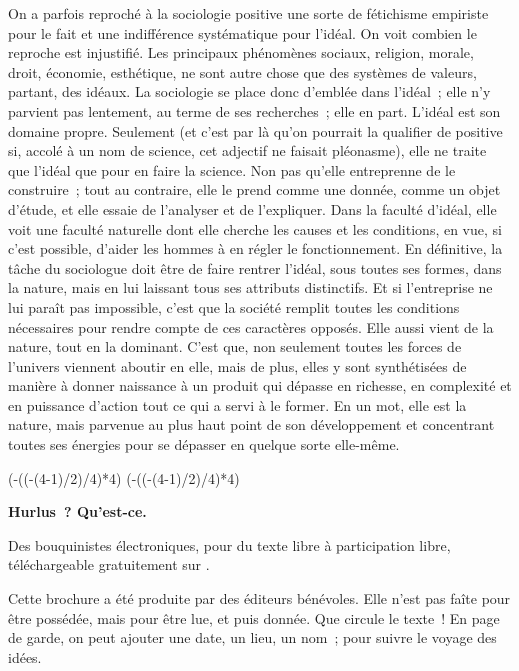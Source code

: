 \documentclass[french,twoside]{book} %
\def\truncdiv#1#2{((#1-(#2-1)/2)/#2)}
\def\moduloop#1#2{(#1-\truncdiv{#1}{#2}*#2)}
\def\modulo#1#2{\number\numexpr\moduloop{#1}{#2}\relax}
\begin{document}
On a parfois reproché à la sociologie positive une sorte de fétichisme empiriste pour le fait et une indifférence systématique pour l’idéal. On voit combien le reproche est injustifié. Les principaux phénomènes sociaux, religion, morale, droit, économie, esthétique, ne sont autre chose que des systèmes de valeurs, partant, des idéaux. La sociologie se place donc d’emblée dans l’idéal ; elle n’y parvient pas lentement, au terme de ses recherches ; elle en part. L’idéal est son domaine propre. Seulement (et c’est par là qu’on pourrait la qualifier de positive si, accolé à un nom de science, cet adjectif ne faisait pléonasme), elle ne traite que l’idéal que pour en faire la science. Non pas qu’elle entreprenne de le construire ; tout au contraire, elle le prend comme une donnée, comme un objet d’étude, et elle essaie de l’analyser et de l’expliquer. Dans la faculté d’idéal, elle voit une faculté naturelle dont elle cherche les causes et les conditions, en vue, si c’est possible, d’aider les hommes à en régler le fonctionnement. En définitive, la tâche du sociologue doit être de faire rentrer l’idéal, sous toutes ses formes, dans la nature, mais en lui laissant tous ses attributs distinctifs. Et si l’entreprise ne lui paraît pas impossible, c’est que la société remplit toutes les conditions nécessaires pour rendre compte de ces caractères opposés. Elle aussi vient de la nature, tout en la dominant. C’est que, non seulement toutes les forces de l’univers viennent aboutir en elle, mais de plus, elles y sont synthétisées de manière à donner naissance à un produit qui dépasse en richesse, en complexité et en puissance d’action tout ce qui a servi à le former. En un mot, elle est la nature, mais parvenue au plus haut point de son développement et concentrant toutes ses énergies pour se dépasser en quelque sorte elle-même.
 


\ifbooklet
  \pagestyle{empty}
  \clearpage
  \ifnum\modulo{\value{page}}{4}=0 \hbox{}\newpage\hbox{}\newpage\fi
  \ifnum\modulo{\value{page}}{4}=1 \hbox{}\newpage\hbox{}\newpage\fi


  \hbox{}\newpage
  \ifodd\value{page}\hbox{}\newpage\fi
  {\centering\color{rubric}\bfseries\noindent\large
    Hurlus ? Qu’est-ce.\par
    \bigskip
  }
  \noindent Des bouquinistes électroniques, pour du texte libre à participation libre,
  téléchargeable gratuitement sur \href{https://hurlus.fr}{}.\par
  \bigskip
  \noindent Cette brochure a été produite par des éditeurs bénévoles.
  Elle n’est pas faîte pour être possédée, mais pour être lue, et puis donnée.
  Que circule le texte !
  En page de garde, on peut ajouter une date, un lieu, un nom ; pour suivre le voyage des idées.
  \par
\end{document}
